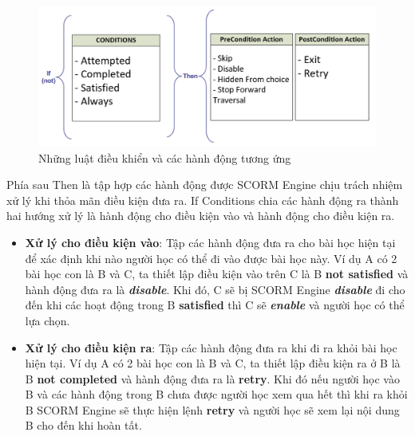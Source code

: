 	
		\begin{center}
		\begin{figure}[htp]
			\begin{center}
				\includegraphics[width=15cm]{Chapter3/Pictures/picture39.png}
			\end{center}
			\caption{Những luật điều khiển và các hành động tương ứng}
			\label{refpicture410}
		\end{figure}
	\end{center}

	Phía sau Then là tập hợp các hành động được SCORM Engine chịu trách nhiệm xử lý khi thỏa mãn điều kiện đưa ra. If Conditions chia các hành động ra thành hai hướng xử lý là hành động cho điều kiện vào và hành động cho điều kiện ra.\\
	
	\begin{itemize}
		\item \textbf{Xử lý cho điều kiện vào}: Tập các hành động đưa ra cho bài học hiện tại để xác định khi nào người học có thể đi vào được bài học này. Ví dụ A có 2 bài học con là B và C, ta thiết lập điều kiện vào trên C là B \textbf{not satisfied} và hành động đưa ra là \textbf{\textit{disable}}. Khi đó, C sẽ bị SCORM Engine \textbf{\textit{disable}} đi cho đến khi các hoạt động trong B \textbf{satisfied} thì C sẽ \textbf{\textit{enable}} và người học có thể lựa chọn.
		
		\item \textbf{Xử lý cho điều kiện ra}: Tập các hành động đưa ra khi đi ra khỏi bài học hiện tại. Ví dụ A có 2 bài học con là B và C, ta thiết lập điều kiện ra ở B là B \textbf{not completed} và hành động đưa ra là \textbf{retry}. Khi đó nếu người học vào B và các hành động trong B chưa được người học xem qua hết thì khi ra khỏi B SCORM Engine sẽ thực hiện lệnh \textbf{retry} và người học sẽ xem lại nội dung B cho đến khi hoàn tất.
	\end{itemize}

	\vspace{1cm}
	
